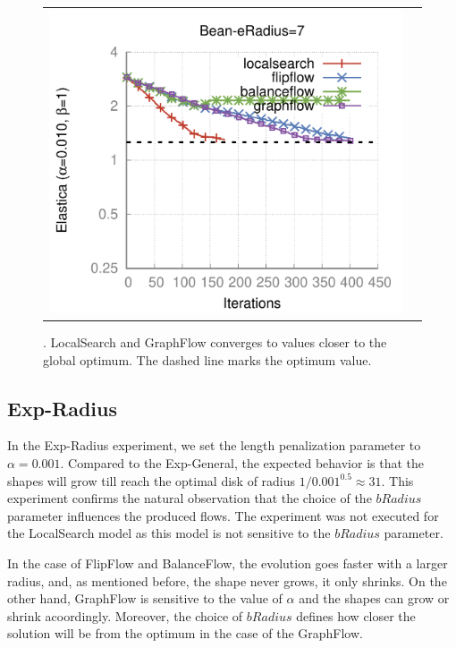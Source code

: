 \begin{figure}
\begin{tabular}{cc}
\includegraphics[scale=0.45]{figures/chapter9/free-elastica/plots/iteration/main_experiment/len_pen_0.01/radius-7/bean.pdf}
\end{tabular}
\caption{. LocalSearch and GraphFlow converges to values closer to the global optimum. The dashed line marks the optimum value.}
\label{ch9:fig:plots-free-elastica-general}
\end{figure}

\subsection{Exp-Radius}

In the Exp-Radius experiment, we set the length penalization parameter to $\alpha=0.001$. Compared to the Exp-General, the expected behavior is that the shapes will grow till reach the optimal disk of radius $1/0.001^{0.5} \approx 31$. This experiment confirms the natural observation that the choice of the $bRadius$ parameter influences the produced flows. The experiment was not executed for the LocalSearch model as this model is not sensitive to the $bRadius$ parameter.

In the case of FlipFlow and BalanceFlow, the evolution goes faster with a larger radius, and, as mentioned before, the shape never grows, it only shrinks. On the other hand, GraphFlow is sensitive to the value of $\alpha$ and the shapes can grow or shrink acoordingly. Moreover, the choice of $bRadius$ defines how closer the solution will be from the optimum in the case of the GraphFlow.

